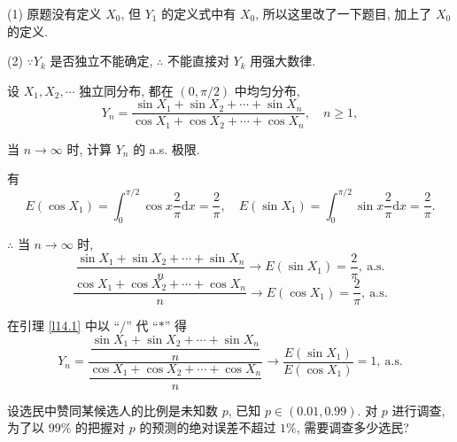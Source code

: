 \documentclass{ctexart}
\begin{document}
\begin{note}
    (1) 原题没有定义 $X_0$, 但 $Y_1$ 的定义式中有 $X_0$, 所以这里改了一下题目, 加上了 $X_0$ 的定义.

    (2) $\because Y_k$ 是否独立不能确定, $\therefore$ 不能直接对 $Y_k$ 用强大数律.
\end{note}
\begin{exercise}\label{ex7.10}
    设 $X_1,X_2,\cdots$ 独立同分布, 都在 $(0,\pi/2)$ 中均匀分布,
    \[Y_n=\dfrac{\sin X_1+\sin X_2+\cdots+\sin X_n}{\cos X_1+\cos X_2+\cdots+\cos X_n},\quad n\geq1,\]
    
    当 $n\to\infty$ 时, 计算 $Y_n$ 的 a.s. 极限.
\end{exercise}
\begin{solution}
    有
    \[E(\cos X_1)=\int_0^{\pi/2}\cos x\dfrac{2}{\pi}\mathrm{d}x=\dfrac{2}{\pi},\quad E(\sin X_1)=\int_0^{\pi/2}\sin x\dfrac{2}{\pi}\mathrm{d}x=\dfrac{2}{\pi}.\]

    $\therefore$ 当 $n\to\infty$ 时,
    \[\dfrac{\sin X_1+\sin X_2+\cdots+\sin X_n}{n}\to E(\sin X_1)=\dfrac{2}{\pi},\ \text{a.s.}\]
    \[\dfrac{\cos X_1+\cos X_2+\cdots+\cos X_n}{n}\to E(\cos X_1)=\dfrac{2}{\pi},\ \text{a.s.}\]

    在引理 \ref{l14.1} 中以 ``$/$'' 代 ``$*$'' 得
    \[Y_n=\dfrac{\dfrac{\sin X_1+\sin X_2+\cdots+\sin X_n}{n}}{\dfrac{\cos X_1+\cos X_2+\cdots+\cos X_n}{n}}\to\dfrac{E(\sin X_1)}{E(\cos X_1)}=1,\ \text{a.s.}\]
\end{solution}
\addtocounter{exercise}{3}
\begin{exercise}%
    设选民中赞同某候选人的比例是未知数 $p$, 已知 $p\in(0.01,0.99)$. 对 $p$ 进行调查, 为了以 $99\%$ 的把握对 $p$ 的预测的绝对误差不超过 $1\%$, 需要调查多少选民?
\end{exercise}
\end{document}
